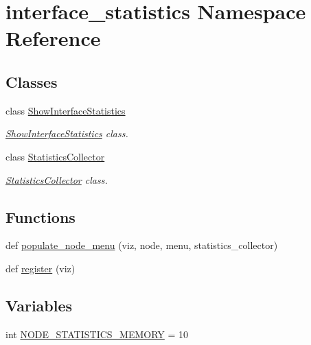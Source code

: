 \hypertarget{namespaceinterface__statistics}{}\section{interface\+\_\+statistics Namespace Reference}
\label{namespaceinterface__statistics}
\subsection*{Classes}
\begin{DoxyCompactItemize}
\item 
class \hyperlink{classinterface__statistics_1_1ShowInterfaceStatistics}{Show\+Interface\+Statistics}
\begin{DoxyCompactList}\small\item\em \hyperlink{classinterface__statistics_1_1ShowInterfaceStatistics}{Show\+Interface\+Statistics} class. \end{DoxyCompactList}\item 
class \hyperlink{classinterface__statistics_1_1StatisticsCollector}{Statistics\+Collector}
\begin{DoxyCompactList}\small\item\em \hyperlink{classinterface__statistics_1_1StatisticsCollector}{Statistics\+Collector} class. \end{DoxyCompactList}\end{DoxyCompactItemize}
\subsection*{Functions}
\begin{DoxyCompactItemize}
\item 
def \hyperlink{namespaceinterface__statistics_a6c76724ea6897d8db848321852e281dc}{populate\+\_\+node\+\_\+menu} (viz, node, menu, statistics\+\_\+collector)
\item 
def \hyperlink{namespaceinterface__statistics_a357a8afc147af2bf315062dfbf6b6fef}{register} (viz)
\end{DoxyCompactItemize}
\subsection*{Variables}
\begin{DoxyCompactItemize}
\item 
int \hyperlink{namespaceinterface__statistics_aa2d05f2c71bd7460038005c7d1e1e8ae}{N\+O\+D\+E\+\_\+\+S\+T\+A\+T\+I\+S\+T\+I\+C\+S\+\_\+\+M\+E\+M\+O\+RY} = 10
\end{DoxyCompactItemize}


